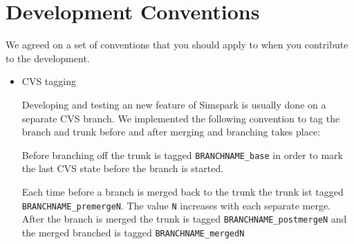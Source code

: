 \chapter{Development Conventions}

We agreed on a set of conventions that you should apply to when you
contribute to the development.

\begin{itemize}

\item{CVS tagging}

Developing and testing an new feature of Simspark is usually done on a
separate CVS branch. We implemented the following convention to tag
the branch and trunk before and after merging and branching takes
place:

Before branching off the trunk is tagged \texttt{BRANCHNAME\_base} in
order to mark the last CVS state before the branch is started.

Each time before a branch is merged back to the trunk the trunk ist tagged 
\texttt{BRANCHNAME\_premergeN}. The value \texttt{N} increases with each separate merge. 
After the branch is merged the trunk is tagged
\texttt{BRANCHNAME\_postmergeN} and the merged branched is tagged
\texttt{BRANCHNAME\_mergedN}

\end{itemize}


